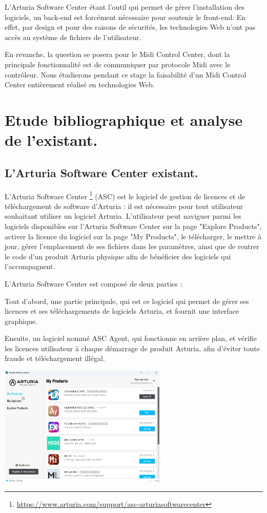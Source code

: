 \documentclass[francais]{rapportPFE}  %
\begin{document}
L'Arturia Software Center étant l'outil qui permet de gérer l'installation des logiciels, un back-end est forcément nécessaire pour soutenir le front-end. En effet, par design et pour des raisons de sécurités, les technologies Web n'ont pas accès au système de fichiers de l'utilisateur.

En revanche, la question se posera pour le Midi Control Center, dont la principale fonctionnalité est de communiquer par protocole Midi avec le contrôleur. Nous étudierons pendant ce stage la faisabilité d'un Midi Control Center entièrement réalisé en technologies Web.

\section{Etude bibliographique et analyse de l'existant.}
\subsection{L'Arturia Software Center existant.}

L’Arturia Software Center
\footnote{\url{https://www.arturia.com/support/asc-arturiasoftwarecenter}}
 (ASC) est le logiciel de gestion de licences et de
téléchargement de software d’Arturia : il est nécessaire pour tout utilisateur
souhaitant utiliser un logiciel Arturia. L'utilisateur peut naviguer parmi les logiciels disponibles sur l'Arturia Software Center sur la page "Explore Products", activer la licence du logiciel sur la page "My Products", le télécharger, le mettre à jour, gérer l'emplacement de ses fichiers dans les paramètres, ainsi que de rentrer le code d'un produit Arturia physique afin de bénéficier des logiciels qui l'accompagnent.

L’Arturia Software Center est composé de deux parties : 

Tout d'abord, une partie principale, qui est ce logiciel qui permet de gérer ses licences et ses téléchargements de logiciels Arturia, et fournit une interface graphique.

Ensuite, un logiciel nommé ASC Agent, qui fonctionne en arrière plan, et vérifie les licences utilisateur à chaque démarrage de produit Arturia, afin d'éviter toute fraude et téléchargement illégal.

\begin{center}
	\centering
	\includegraphics[width=0.6\textwidth]{graphics/asc_existant.png}
	\begin{tiny}
	\end{tiny}
	\label{fig}
\end{center}
\end{document}
